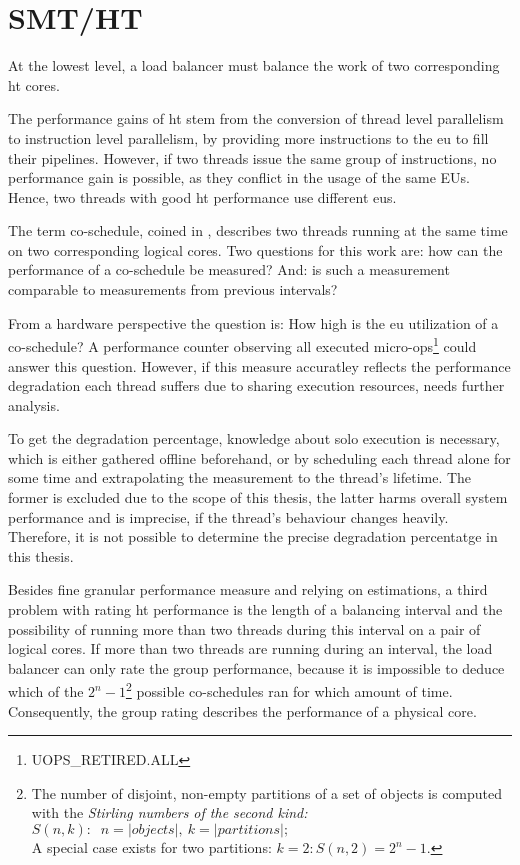 \section{SMT/HT}
\label{design:smt}


At the lowest level, a load balancer must balance the work of two corresponding
\gls{ht} cores.

The performance gains of \gls{ht} stem from the conversion of thread level
parallelism to instruction level parallelism, by providing more instructions to
the \gls{eu} to fill their pipelines.
However, if two threads issue the same group of instructions, no performance gain is
possible, as they conflict in the usage of the same EUs.
Hence, two threads with good \gls{ht} performance use different \gls{eu}s.

The term co-schedule, coined in \cite{snavely_symbiotic_2000}, describes two
threads running at the same time on two corresponding logical cores.
Two questions for this work are: how can the performance of a co-schedule be
measured? And: is such a measurement comparable to measurements from previous
intervals?

From a hardware perspective the question is: How high is the \gls{eu}
utilization of a co-schedule?
A performance counter observing all executed
micro-ops\footnote{UOPS\_RETIRED.ALL} could answer this question.
However, if this measure accuratley reflects the performance degradation each thread
suffers due to sharing execution resources, needs further analysis.

To get the degradation percentage, knowledge about solo execution is necessary,
which is either gathered offline beforehand, or by scheduling each thread alone
for some time and extrapolating the measurement to the thread's lifetime.
The former is excluded due to the scope of this thesis, the latter harms
overall system performance and is imprecise, if the thread's behaviour changes
heavily.
Therefore, it is not possible to determine the precise degradation percentatge
in this thesis.

Besides fine granular performance measure and relying on estimations, a third
problem with rating \gls{ht} performance is the length of a balancing interval
and the possibility of running more than two threads during this interval on a
pair of logical cores.
If more than two threads are running during an interval, the load balancer can
only rate the group performance, because it is impossible to deduce which
of the
$2^n-1$\footnote{The number of disjoint, non-empty partitions of a set of
  objects is computed with the \emph{Stirling numbers of the second kind:}
  $S(n,k):\;\; n = |objects|,\: k = |partitions|;$\\A special case exists for
two partitions: $k = 2: S(n,2) = 2^n-1$.}
%
possible co-schedules ran for which amount of time.
Consequently, the group rating describes the performance of a physical core.

